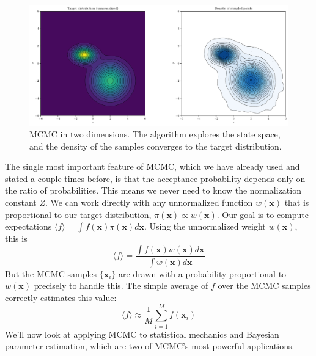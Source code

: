 \begin{figure}[htbp]
    \centering
    \includegraphics[width=\textwidth]{./figs/monte-carlo/mcmc_2d.pdf}
    \caption{MCMC in two dimensions. The algorithm explores the state space, and the density of the samples converges to the target distribution.}
    \label{fig:mcmc-2d}
\end{figure}

The single most important feature of MCMC, which we have already used and stated a couple times before, is that the acceptance probability depends only on the ratio of probabilities. This means we never need to know the normalization constant $Z$. We can work directly with any unnormalized function $w(\mathbf{x})$ that is proportional to our target distribution, $\pi(\mathbf{x}) \propto w(\mathbf{x})$. Our goal is to compute expectations $\langle f \rangle = \int f(\mathbf{x}) \pi(\mathbf{x}) d\mathbf{x}$. Using the unnormalized weight $w(\mathbf{x})$, this is
\begin{equation}
    \langle f \rangle = \frac{\int f(\mathbf{x}) w(\mathbf{x}) d\mathbf{x}}{\int w(\mathbf{x}) d\mathbf{x}}
\end{equation}
But the MCMC samples $\{\mathbf{x}_i\}$ are drawn with a probability proportional to $w(\mathbf{x})$ precisely to handle this. The simple average of $f$ over the MCMC samples correctly estimates this value:
\begin{equation}
    \langle f \rangle \approx \frac{1}{M} \sum_{i=1}^{M} f(\mathbf{x}_i)
\end{equation}
We'll now look at applying MCMC to statistical mechanics and Bayesian parameter estimation, which are two of MCMC's most powerful applications.

